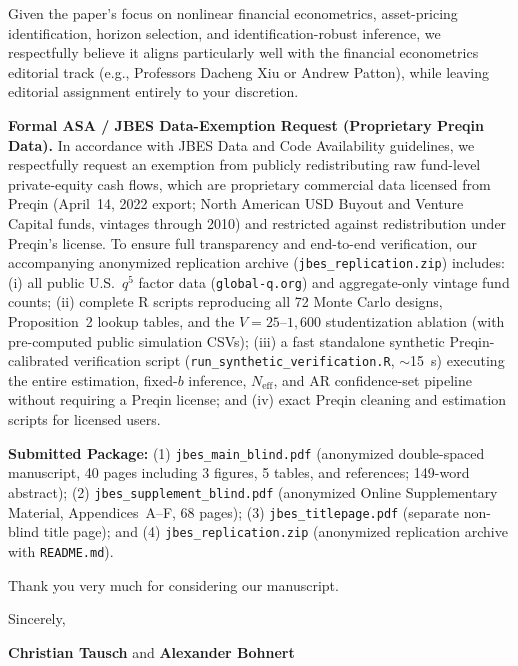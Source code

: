 \documentclass[11pt]{article}
\begin{document}
Given the paper's focus on nonlinear financial econometrics, asset-pricing identification, horizon selection, and identification-robust inference, we respectfully believe it aligns particularly well with the financial econometrics editorial track (e.g., Professors Dacheng Xiu or Andrew Patton), while leaving editorial assignment entirely to your discretion.

\textbf{Formal ASA / JBES Data-Exemption Request (Proprietary Preqin Data).} In accordance with JBES Data and Code Availability guidelines, we respectfully request an exemption from publicly redistributing raw fund-level private-equity cash flows, which are proprietary commercial data licensed from Preqin (April~14, 2022 export; North American USD Buyout and Venture Capital funds, vintages through 2010) and restricted against redistribution under Preqin's license. To ensure full transparency and end-to-end verification, our accompanying anonymized replication archive (\texttt{jbes\_replication.zip}) includes: (i) all public U.S.\ $q^5$ factor data (\texttt{global-q.org}) and aggregate-only vintage fund counts; (ii) complete R scripts reproducing all 72 Monte Carlo designs, Proposition~2 lookup tables, and the $V=25\text{--}1{,}600$ studentization ablation (with pre-computed public simulation CSVs); (iii) a fast standalone synthetic Preqin-calibrated verification script (\texttt{run\_synthetic\_verification.R}, $\sim$15~s) executing the entire estimation, fixed-$b$ inference, $N_{\mathrm{eff}}$, and AR confidence-set pipeline without requiring a Preqin license; and (iv) exact Preqin cleaning and estimation scripts for licensed users.

\textbf{Submitted Package:} (1) \texttt{jbes\_main\_blind.pdf} (anonymized double-spaced manuscript, 40 pages including 3 figures, 5 tables, and references; 149-word abstract); (2) \texttt{jbes\_supplement\_blind.pdf} (anonymized Online Supplementary Material, Appendices~A--F, 68 pages); (3) \texttt{jbes\_titlepage.pdf} (separate non-blind title page); and (4) \texttt{jbes\_replication.zip} (anonymized replication archive with \texttt{README.md}).

Thank you very much for considering our manuscript.

\medskip
\noindent Sincerely,

\medskip
\noindent\textbf{Christian Tausch} and \textbf{Alexander Bohnert}
\end{document}
